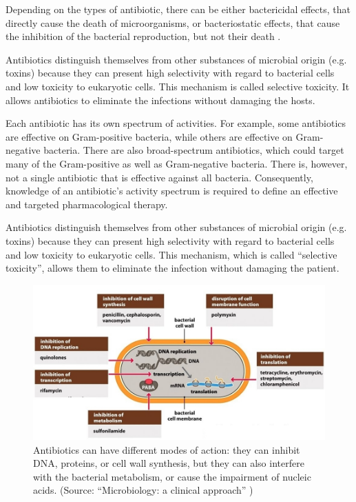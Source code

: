 \documentclass[11pt]{report}
\begin{document}
Depending on the types of antibiotic, there can be either bactericidal effects, that directly cause the death of microorganisms, or bacteriostatic effects, that cause the inhibition of the bacterial reproduction, but not their death \cite{Leekha2011}.

Antibiotics distinguish themselves from other substances of microbial origin (e.g. toxins) because they can present high selectivity with regard to bacterial cells and low toxicity to eukaryotic cells. This mechanism is called selective toxicity. It allows antibiotics to eliminate the infections without damaging the hosts.

Each antibiotic has its own spectrum of activities. For example, some antibiotics are effective on Gram-positive bacteria, while others are effective on Gram-negative bacteria.
There are also broad-spectrum antibiotics, which could target many of the Gram-positive as well as Gram-negative bacteria.
There is, however, not a single antibiotic that is effective against all bacteria.
Consequently, knowledge of an antibiotic’s activity spectrum is required to define an effective and targeted pharmacological therapy.

Antibiotics distinguish themselves from other substances of microbial origin (e.g. toxins) because they can present high selectivity with regard to bacterial cells and low toxicity to eukaryotic cells.
This mechanism, which is called “selective toxicity”, allows them to eliminate the infection without damaging the patient.

\clearpage
\begin{figure}[htp]
\centering
\includegraphics[scale=0.4500]{img/ant_targ.png}
\caption{Antibiotics can have different modes of action: they can inhibit DNA, proteins, or cell wall  synthesis, but they can also interfere with the bacterial metabolism, or cause the impairment of nucleic acids. (Source: ``Microbiology: a clinical approach'' \cite{microbiology})}
\label{ant_targ}
\end{figure}
\end{document}
